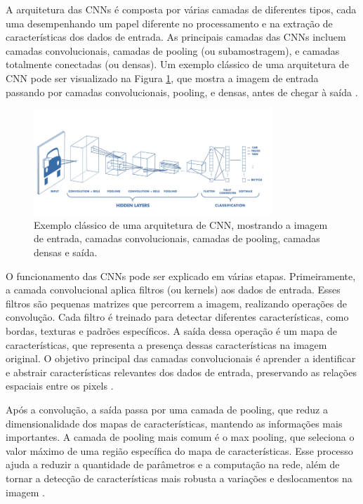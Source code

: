 A arquitetura das CNNs é composta por várias camadas de diferentes tipos, cada uma desempenhando um papel diferente no processamento e na extração de características dos dados de entrada. As principais camadas das CNNs incluem camadas convolucionais, camadas de pooling (ou subamostragem), e camadas totalmente conectadas (ou densas). Um exemplo clássico de uma arquitetura de CNN pode ser visualizado na Figura \ref{fig:cnnexample}, que mostra a imagem de entrada passando por camadas convolucionais, pooling, e densas, antes de chegar à saída \cite{o2015introduction}.

\begin{figure}
    \centering   
    \includegraphics[width=0.8\textwidth]{fig/CNNExample.png}
    \caption{Exemplo clássico de uma arquitetura de CNN, mostrando a imagem de entrada, camadas convolucionais, camadas de pooling, camadas densas e saída.}
    \label{fig:cnnexample}
\end{figure} %


O funcionamento das CNNs pode ser explicado em várias etapas. Primeiramente, a camada convolucional aplica filtros (ou kernels) aos dados de entrada. Esses filtros são pequenas matrizes que percorrem a imagem, realizando operações de convolução. Cada filtro é treinado para detectar diferentes características, como bordas, texturas e padrões específicos. A saída dessa operação é um mapa de características, que representa a presença dessas características na imagem original. O objetivo principal das camadas convolucionais é aprender a identificar e abstrair características relevantes dos dados de entrada, preservando as relações espaciais entre os pixels \cite{aggarwal2018neural}.

Após a convolução, a saída passa por uma camada de pooling, que reduz a dimensionalidade dos mapas de características, mantendo as informações mais importantes. A camada de pooling mais comum é o max pooling, que seleciona o valor máximo de uma região específica do mapa de características. Esse processo ajuda a reduzir a quantidade de parâmetros e a computação na rede, além de tornar a detecção de características mais robusta a variações e deslocamentos na imagem \cite{aggarwal2018neural}.

